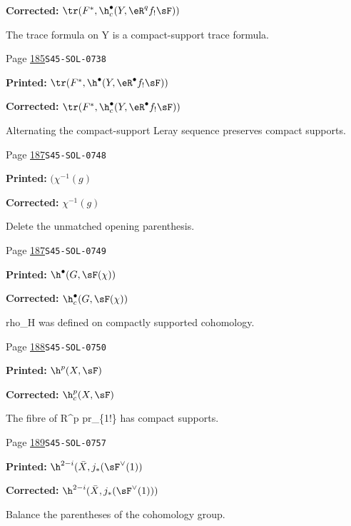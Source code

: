 \begin{description}
\par\noindent\textbf{Corrected:} \(\tr(F^\ast,\h_c^\bullet(Y,\eR^q f_! \sF))\)
\par\noindent The trace formula on Y is a compact-support trace formula.
\smallskip
\item[\hypertarget{apparatus:EN-0110}{110}] Page \hyperlink{printpage:en:185}{185}\quad\texttt{S45-SOL-0738}
\par\noindent\textbf{Printed:} \(\tr(F^\ast,\h^\bullet(Y,\eR^\bullet f_! \sF))\)
\par\noindent\textbf{Corrected:} \(\tr(F^\ast,\h_c^\bullet(Y,\eR^\bullet f_! \sF))\)
\par\noindent Alternating the compact-support Leray sequence preserves compact supports.
\smallskip
\item[\hypertarget{apparatus:EN-0111}{111}] Page \hyperlink{printpage:en:187}{187}\quad\texttt{S45-SOL-0748}
\par\noindent\textbf{Printed:} \((\chi^{-1}(g)\)
\par\noindent\textbf{Corrected:} \(\chi^{-1}(g)\)
\par\noindent Delete the unmatched opening parenthesis.
\smallskip
\item[\hypertarget{apparatus:EN-0112}{112}] Page \hyperlink{printpage:en:187}{187}\quad\texttt{S45-SOL-0749}
\par\noindent\textbf{Printed:} \(\h^\bullet(G,\sF(\chi))\)
\par\noindent\textbf{Corrected:} \(\h_c^\bullet(G,\sF(\chi))\)
\par\noindent rho\_H was defined on compactly supported cohomology.
\smallskip
\item[\hypertarget{apparatus:EN-0113}{113}] Page \hyperlink{printpage:en:188}{188}\quad\texttt{S45-SOL-0750}
\par\noindent\textbf{Printed:} \(\h^p(X,\sF)\)
\par\noindent\textbf{Corrected:} \(\h_c^p(X,\sF)\)
\par\noindent The fibre of R\textasciicircum{}p pr\_\{1!\} has compact supports.
\smallskip
\item[\hypertarget{apparatus:EN-0114}{114}] Page \hyperlink{printpage:en:189}{189}\quad\texttt{S45-SOL-0757}
\par\noindent\textbf{Printed:} \(\h^{2-i}(\bar X,j_\ast(\sF^\vee(1))\)
\par\noindent\textbf{Corrected:} \(\h^{2-i}(\bar X,j_\ast(\sF^\vee(1)))\)
\par\noindent Balance the parentheses of the cohomology group.

\end{description}
